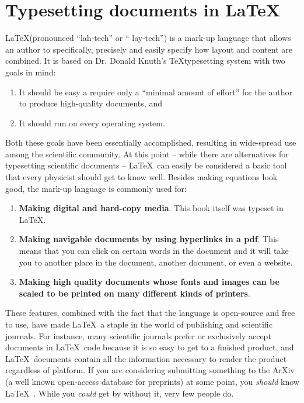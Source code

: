 

\chapter{Typesetting documents in \LaTeX}


\LaTeX (pronounced ``lah-tech'' or `` lay-tech'') is a mark-up language that allows an author to specifically, precisely and easily specify how layout and content are combined. It is based on Dr. Donald Knuth's \TeX typesetting system with two goals in mind:\\


\begin{enumerate}
\item It should  be easy a require only a ``minimal amount of effort'' for the author to produce high-quality documents, and
\item It should run on every operating system.\\
\end{enumerate}

Both these goals have been essentially accomplished, resulting in wide-spread use among the scientific community. At this point -- while there are alternatives for typesetting scientific documents  --  \LaTeX\ can easily be considered a basic tool that every physicist should get to know well. Besides making equations look good, the mark-up language is commonly used for:\\


\begin{enumerate}
\item {\bf Making digital and hard-copy media}. This book itself was typeset in \LaTeX.
\item {\bf Making navigable documents by using hyperlinks in a pdf}. This means that you can click on certain words in the document and it will take you to another place in the document, another document, or even a website.
\item {\bf Making high quality documents whose fonts and images can be scaled to be printed on many different kinds of printers}.\\
\end{enumerate}
These features, combined with the fact that the language is open-source and free to use, have made \LaTeX\ a staple in the world of publishing and scientific journals. For instance, many scientific journals prefer or exclusively accept documents in \LaTeX\ code because it is so easy to get to a finished product, and \LaTeX\ documents contain all the information necessary to render the product regardless of platform. If you are considering submitting something to the ArXiv (a well known open-access database for preprints) at some point, you \emph{should} know \LaTeX\ . While you \emph{could} get by without it, very few people do.

